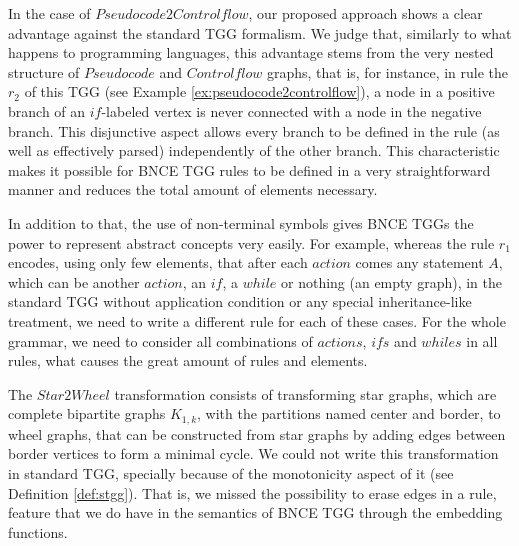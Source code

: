 \documentclass[]{report}
\begin{document}
In the case of $Pseudocode2Controlflow$, our proposed approach shows a clear advantage against the standard TGG formalism. We judge that, similarly to what happens to programming languages, this advantage stems from the very nested structure of $Pseudocode$ and $Controlflow$ graphs, that is, for instance, in rule the $r_2$ of this TGG (see Example \ref{ex:pseudocode2controlflow}), a node in a positive branch of an $if$-labeled vertex is never connected with a node in the negative branch. This disjunctive aspect allows every branch to be defined in the rule (as well as effectively parsed) independently of the other branch. This characteristic makes it possible for BNCE TGG rules to be defined in a very straightforward manner and reduces the total amount of elements necessary.

In addition to that, the use of non-terminal symbols gives BNCE TGGs the power to represent abstract concepts very easily. For example, whereas the rule $r_1$ encodes, using only few elements, that after each $action$ comes any statement $A$, which can be another $action$, an $if$, a $while$ or nothing (an empty graph), in the standard TGG without application condition or any special inheritance-like treatment, we need to write a different rule for each of these cases. For the whole grammar, we need to consider all combinations of $actions$, $ifs$ and $whiles$ in all rules, what causes the great amount of rules and elements.

The $Star2Wheel$ transformation consists of transforming star graphs, which are complete bipartite graphs $K_{1,k}$, with the partitions named center and border, to wheel graphs, that can be constructed from star graphs by adding edges between border vertices to form a minimal cycle. We could not write this transformation in standard TGG, specially because of the monotonicity aspect of it (see Definition \ref{def:stgg}). That is, we missed the possibility to erase edges in a rule, feature that we do have in the semantics of BNCE TGG through the embedding functions.



\end{document}
